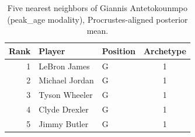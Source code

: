 \begin{table}[htbp]
  \centering\small
  \begin{tabular}{rllc}
    \toprule
    Rank & Player & Position & Archetype \\
    \midrule
    1 & LeBron James & G & 1 \\
    2 & Michael Jordan & G & 1 \\
    3 & Tyson Wheeler & G & 1 \\
    4 & Clyde Drexler & G & 1 \\
    5 & Jimmy Butler & G & 1 \\
    \bottomrule
  \end{tabular}
  \caption{Five nearest neighbors of Giannis Antetokounmpo (peak_age modality), Procrustes-aligned posterior mean.}
  \label{tab:Giannis_Antetokounmpo_neighbors_peak_age}
\end{table}

